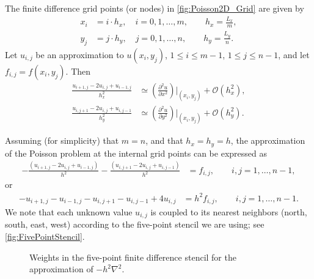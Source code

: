 The finite difference grid points (or nodes) in \autoref{fig:Poisson2D_Grid} are
given by
\begin{align*}
  x_i &= i \cdot h_x, \quad i=0,1,\ldots,m, \qquad h_x = \frac{L_x}{m}, \\
  y_j &= j \cdot h_y, \quad j=0,1,\ldots,n, \qquad h_y = \frac{L_y}{n}.
\end{align*}
Let $u_{i,j}$ be an approximation to $u(x_i,y_j)$, $1\leq i\leq m-1$, $1\leq
j\leq n-1$, and let $f_{i,j} = f(x_i,y_j)$. Then
\begin{align*}
  \frac{u_{i+1,j} - 2 u_{i,j} + u_{i-1,j}}{h_x^2}
  &\simeq \left( \frac{\partial^2 u}{\partial x^2} \right) \biggl|_{(x_i,y_j)} + \mathcal{O}(h_x^2), \\
  \frac{u_{i,j+1} - 2 u_{i,j} + u_{i,j-1}}{h_y^2}
  &\simeq \left( \frac{\partial^2 u}{\partial y^2} \right) \biggl|_{(x_i,y_j)} + \mathcal{O}(h_y^2).
\end{align*}

Assuming (for simplicity) that $m=n$, and that $h_x=h_y=h$, the approximation of
the Poisson problem at the internal grid points can be expressed as
\begin{align*}
  -\frac{(u_{i+1,j}-2u_{i,j}+u_{i-1,j})}{h^2}
  -\frac{(u_{i,j+1}-2u_{i,j}+u_{i,j-1})}{h^2}
  &= f_{i,j}, \qquad i,j=1,\ldots,n-1,
\end{align*}
or
\begin{align}
  -u_{i+1,j}-u_{i-1,j}-u_{i,j+1}-u_{i,j-1}+4u_{i,j} &= h^2 f_{i,j}, \qquad i,j=1,\ldots,n-1.
  \label{eq:Poisson2D_disc}
\end{align}
We note that each unknown value $u_{i,j}$ is coupled to its nearest neighbors
(north, south, east, west) according to the five-point stencil we are using; see
\autoref{fig:FivePointStencil}.

\begin{figure}
  \centering
  \caption{
    Weights in the five-point finite difference stencil for the approximation of
    $-h^2\nabla^2$.
  }
  \label{fig:FivePointStencil}
\end{figure}

